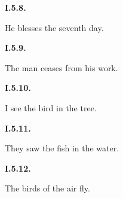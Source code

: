 \par\begin{minipage}{\linewidth}\raggedright
\textbf{I.5.8.}

He blesses the seventh day.

\end{minipage}\par\addvspace{4pt}

\par\begin{minipage}{\linewidth}\raggedright
\textbf{I.5.9.}

The man ceases from his work.

\end{minipage}\par\addvspace{4pt}

\par\begin{minipage}{\linewidth}\raggedright
\textbf{I.5.10.}

I see the bird in the tree.

\end{minipage}\par\addvspace{4pt}

\par\begin{minipage}{\linewidth}\raggedright
\textbf{I.5.11.}

They saw the fish in the water.

\end{minipage}\par\addvspace{4pt}

\par\begin{minipage}{\linewidth}\raggedright
\textbf{I.5.12.}

The birds of the air fly.

\end{minipage}\par\addvspace{4pt}

